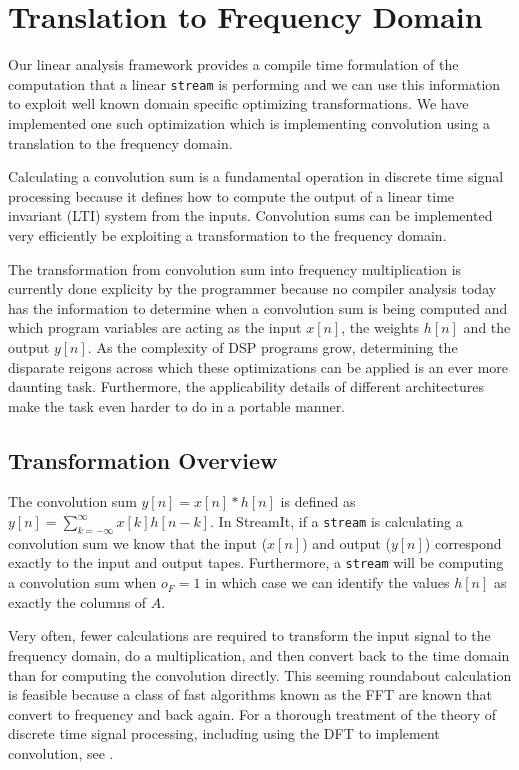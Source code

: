 
\section{Translation to Frequency Domain}

Our linear analysis framework provides a compile time formulation of the 
computation that a linear {\tt stream} is performing and we can use this information 
to exploit well known domain specific optimizing transformations. 
We have implemented one such optimization which is implementing
convolution using a translation to the frequency domain.

Calculating a convolution sum is a fundamental operation in discrete time signal processing 
because it defines how to compute the output of a linear time invariant 
(LTI) system from the inputs. Convolution sums 
can be implemented very efficiently be exploiting a transformation to the frequency domain.

The transformation from convolution sum into frequency multiplication is currently
done explicity by the programmer because no compiler analysis today has the information 
to determine when a convolution sum is being computed and which program variables
are acting as the input $x[n]$, the weights $h[n]$ and the output $y[n]$. As the 
complexity of DSP programs grow, determining the disparate reigons across which these 
optimizations can be applied is an ever more daunting task. Furthermore, the applicability 
details of different architectures make the task even harder to do in a portable manner.

\subsection{Transformation Overview}
The convolution sum $y[n]=x[n]*h[n]$ is defined 
as $y[n]=\sum_{k=-\infty}^{\infty}x[k]h[n-k]$.
In StreamIt, if a {\tt stream} is calculating a convolution sum we know that 
the input ($x[n]$) and output ($y[n]$) correspond exactly to the input and output tapes. 
Furthermore, a {\tt stream} will be computing a convolution sum when $o_F=1$ in which
case we can identify the values $h[n]$ as exactly the columns of $A$.

Very often, fewer calculations are required to transform the input signal to the 
frequency domain, do a multiplication, and then convert back to the time domain
than for computing the convolution directly. This seeming roundabout calculation
is feasible because a class of fast algorithms known as the FFT are known that convert
to frequency and back again. For a thorough treatment of the theory of discrete time 
signal processing, including using the DFT to implement convolution, see \cite{oppenheim-discrete}.


